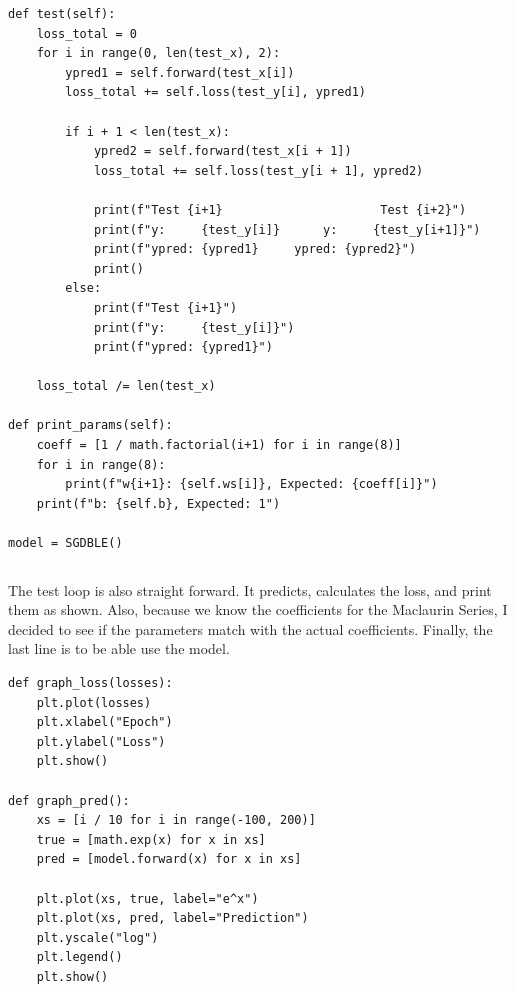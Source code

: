 \documentclass[../../../main.tex]{subfiles}
\begin{document}
\begin{jupyter}
\begin{lstlisting}[style=jin]
def test(self):
    loss_total = 0
    for i in range(0, len(test_x), 2):
        ypred1 = self.forward(test_x[i])
        loss_total += self.loss(test_y[i], ypred1)

        if i + 1 < len(test_x):
            ypred2 = self.forward(test_x[i + 1])
            loss_total += self.loss(test_y[i + 1], ypred2)

            print(f"Test {i+1}                      Test {i+2}")
            print(f"y:     {test_y[i]}      y:     {test_y[i+1]}")
            print(f"ypred: {ypred1}     ypred: {ypred2}")
            print()
        else:
            print(f"Test {i+1}")
            print(f"y:     {test_y[i]}")
            print(f"ypred: {ypred1}")

    loss_total /= len(test_x)

def print_params(self):
    coeff = [1 / math.factorial(i+1) for i in range(8)]
    for i in range(8):
        print(f"w{i+1}: {self.ws[i]}, Expected: {coeff[i]}")
    print(f"b: {self.b}, Expected: 1")

model = SGDBLE()
\end{lstlisting}
\begin{lstlisting}[style=jout]
\end{lstlisting}
\end{jupyter}

The test loop is also straight forward. It predicts, calculates the
loss, and print them as shown. Also, because we know the coefficients
for the Maclaurin Series, I decided to see if the parameters match
with the actual coefficients. Finally, the last line is to be able
use the model.

\begin{jupyter}
\begin{lstlisting}[style=jin]
def graph_loss(losses):
    plt.plot(losses)
    plt.xlabel("Epoch")
    plt.ylabel("Loss")
    plt.show()
    
def graph_pred():
    xs = [i / 10 for i in range(-100, 200)]
    true = [math.exp(x) for x in xs]
    pred = [model.forward(x) for x in xs]

    plt.plot(xs, true, label="e^x")
    plt.plot(xs, pred, label="Prediction")
    plt.yscale("log")
    plt.legend()
    plt.show()
\end{lstlisting}
\begin{lstlisting}[style=jout]
\end{lstlisting}
\end{jupyter}
\end{document}
